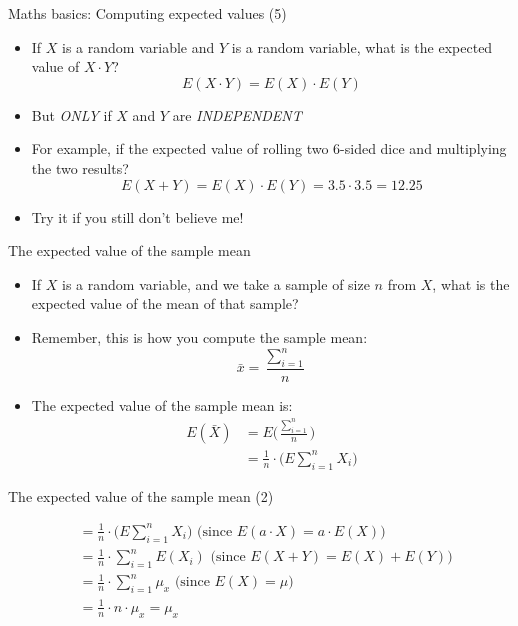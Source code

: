 \begin{frame}{Maths basics: Computing expected values (5)}

\begin{itemize}
\itemsep1pt\parskip0pt
\item
  If \(X\) is a random variable and \(Y\) is a random variable, what is
  the expected value of \(X \cdot Y\)?
  \[E(X \cdot Y) = E(X) \cdot E(Y)\]
\item
  But \emph{ONLY} if \(X\) and \(Y\) are \emph{INDEPENDENT}
\item
  For example, if the expected value of rolling two 6-sided dice and
  multiplying the two results?
  \[ E(X + Y) = E(X) \cdot E(Y)= 3.5 \cdot 3.5 = 12.25\]
\item
  Try it if you still don't believe me!
\end{itemize}

\end{frame}

\begin{frame}{The expected value of the sample mean}

\begin{itemize}
\itemsep1pt\parskip0pt
\item
  If \(X\) is a random variable, and we take a sample of size \(n\) from
  \(X\), what is the expected value of the mean of that sample?
\item
  Remember, this is how you compute the sample mean:
  \[\bar{x} = \frac{\sum\limits_{i=1}^{n}}{n}\]
\item
  The expected value of the sample mean is: \[
  \begin{aligned}
  E(\bar{X}) &= E\Bigg(\frac{\sum\limits_{i=1}^{n}}{n}\Bigg)\\
         &= \frac{1}{n}\cdot\big(E\sum\limits_{i=1}^n{X_i}\big)
  \end{aligned}\]
\end{itemize}

\end{frame}

\begin{frame}{The expected value of the sample mean (2)}

\[
\begin{aligned}
           &= \frac{1}{n}\cdot\big(E\sum\limits_{i=1}^n{X_i}\big) \text{ (since } E(a\cdot X) = a \cdot E(X)\text{)} \\
           &= \frac{1}{n}\cdot\sum\limits_{i=1}^n{E(X_i)} \text{ (since } E(X+Y) = E(X) + E(Y)\text{)} \\
           &= \frac{1}{n}\cdot\sum\limits_{i=1}^n{\mu_x} \text{ (since } E(X) = \mu \text{)} \\
           &= \frac{1}{n}\cdot n \cdot\mu_x = \mu_x
\end{aligned}\]

\end{frame}

